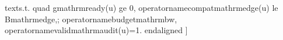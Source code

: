 {}\markdownRendererBackslash{}text\markdownRendererLeftBrace{}s.t.\markdownRendererRightBrace{} \markdownRendererBackslash{}quad \markdownRendererAmpersand{} g\markdownRendererUnderscore{}\markdownRendererLeftBrace{}\markdownRendererBackslash{}mathrm\markdownRendererLeftBrace{}ready\markdownRendererRightBrace{}\markdownRendererRightBrace{}(u) \markdownRendererBackslash{}ge 0, \markdownRendererBackslash{}\markdownRendererSoftLineBreak
{}\markdownRendererAmpersand{} \markdownRendererBackslash{}operatorname\markdownRendererLeftBrace{}compat\markdownRendererRightBrace{}\markdownRendererLeftBrace{}\markdownRendererBackslash{}mathrm\markdownRendererLeftBrace{}edge\markdownRendererRightBrace{}\markdownRendererRightBrace{}(u) \markdownRendererBackslash{}le B\markdownRendererUnderscore{}\markdownRendererLeftBrace{}\markdownRendererBackslash{}mathrm\markdownRendererLeftBrace{}edge\markdownRendererRightBrace{}\markdownRendererRightBrace{},; \markdownRendererBackslash{}operatorname\markdownRendererLeftBrace{}budget\markdownRendererRightBrace{}\markdownRendererLeftBrace{}\markdownRendererBackslash{}mathrm\markdownRendererLeftBrace{}bw\markdownRendererRightBrace{}\markdownRendererRightBrace{}, \markdownRendererBackslash{}\markdownRendererSoftLineBreak
{}\markdownRendererAmpersand{} \markdownRendererBackslash{}operatorname\markdownRendererLeftBrace{}valid\markdownRendererRightBrace{}\markdownRendererLeftBrace{}\markdownRendererBackslash{}mathrm\markdownRendererLeftBrace{}audit\markdownRendererRightBrace{}\markdownRendererRightBrace{}(u)=1.\markdownRendererSoftLineBreak
{}\markdownRendererBackslash{}end\markdownRendererLeftBrace{}aligned\markdownRendererRightBrace{}\markdownRendererSoftLineBreak
{}]\markdownRendererParagraphSeparator
